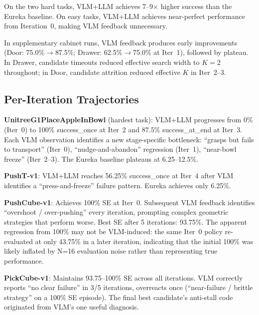 \documentclass[conference]{IEEEtran}
\begin{document}

On the two hard tasks, VLM+LLM achieves 7--9$\times$ higher success than the
Eureka baseline. On easy tasks, VLM+LLM achieves near-perfect performance from
Iteration~0, making VLM feedback unnecessary.

In supplementary cabinet runs, VLM feedback produces early improvements
(Door: 75.0\%$\to$87.5\%; Drawer: 62.5\%$\to$75.0\% at Iter~1), followed by
plateau. In Drawer, candidate timeouts reduced effective search width to $K=2$
throughout; in Door, candidate attrition reduced effective $K$ in Iter~2--3.

\subsection{Per-Iteration Trajectories}


\textbf{UnitreeG1PlaceAppleInBowl} (hardest task): VLM+LLM progresses from 0\%
(Iter~0) to 100\% success\_once at Iter~2 and 87.5\% success\_at\_end at
Iter~3. Each VLM observation identifies a new stage-specific bottleneck:
``grasps but fails to transport'' (Iter~0), ``nudge-and-abandon'' regression
(Iter~1), ``near-bowl freeze'' (Iter~2--3). The Eureka baseline plateaus at
6.25--12.5\%.

\textbf{PushT-v1}: VLM+LLM reaches 56.25\% success\_once at Iter~4 after VLM
identifies a ``press-and-freeze'' failure pattern. Eureka achieves only 6.25\%.

\textbf{PushCube-v1}: Achieves 100\% SE at Iter~0. Subsequent VLM feedback
identifies ``overshoot / over-pushing'' every iteration, prompting complex
geometric strategies that perform worse. Best SE after 5 iterations: 93.75\%.
The apparent regression from 100\% may not be VLM-induced: the same Iter~0
policy re-evaluated at only 43.75\% in a later iteration, indicating that the
initial 100\% was likely inflated by N=16 evaluation noise rather than
representing true performance.

\textbf{PickCube-v1}: Maintains 93.75--100\% SE across all iterations. VLM
correctly reports ``no clear failure'' in 3/5 iterations, overreacts once
(``near-failure / brittle strategy'' on a 100\% SE episode). The final best
candidate's anti-stall code originated from VLM's one useful diagnosis.
\end{document}
